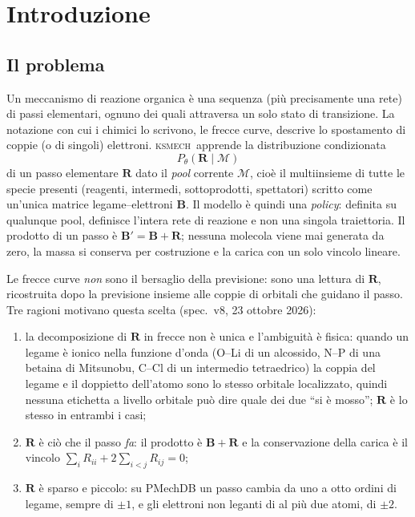 \documentclass[11pt,a4paper]{report}
\newcommand{\vb}[1]{\bm{#1}}
\newcommand{\ksm}{\textsc{ksmech}}
\begin{document}
\tableofcontents
\chapter{Introduzione}
\label{ch:intro}

\section{Il problema}
Un meccanismo di reazione organica è una sequenza (più precisamente una rete) di passi elementari,
ognuno dei quali attraversa un solo stato di transizione. La notazione con cui i chimici lo scrivono,
le frecce curve, descrive lo spostamento di coppie (o di singoli) elettroni. \ksm\ apprende la
distribuzione condizionata
\[
P_\theta(\vb{R}\mid\mathcal{M})
\]
di un passo elementare $\vb{R}$ dato il \emph{pool} corrente $\mathcal{M}$, cioè il multiinsieme di
tutte le specie presenti (reagenti, intermedi, sottoprodotti, spettatori) scritto come un'unica
matrice legame--elettroni $\vb{B}$. Il modello è quindi una \emph{policy}: definita su qualunque
pool, definisce l'intera rete di reazione e non una singola traiettoria. Il prodotto di un passo è
$\vb{B}'=\vb{B}+\vb{R}$; nessuna molecola viene mai generata da zero, la massa si conserva per
costruzione e la carica con un solo vincolo lineare.

Le frecce curve \emph{non} sono il bersaglio della previsione: sono una lettura di $\vb{R}$,
ricostruita dopo la previsione insieme alle coppie di orbitali che guidano il passo. Tre ragioni
motivano questa scelta (spec.\ v8, 23 ottobre 2026):
\begin{enumerate}
\item la decomposizione di $\vb{R}$ in frecce non è unica e l'ambiguità è fisica: quando un legame è
  ionico nella funzione d'onda (O--Li di un alcossido, N--P di una betaina di Mitsunobu, C--Cl di un
  intermedio tetraedrico) la coppia del legame e il doppietto dell'atomo sono lo stesso orbitale
  localizzato, quindi nessuna etichetta a livello orbitale può dire quale dei due \enquote{si è mosso};
  $\vb{R}$ è lo stesso in entrambi i casi;
\item $\vb{R}$ è ciò che il passo \emph{fa}: il prodotto è $\vb{B}+\vb{R}$ e la conservazione della
  carica è il vincolo $\sum_i R_{ii}+2\sum_{i<j}R_{ij}=0$;
\item $\vb{R}$ è sparso e piccolo: su PMechDB un passo cambia da uno a otto ordini di legame, sempre
  di $\pm1$, e gli elettroni non leganti di al più due atomi, di $\pm2$.
\end{enumerate}
\end{document}
